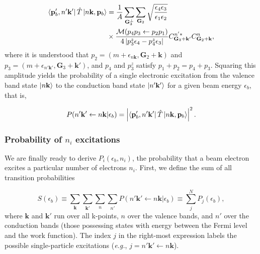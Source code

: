 \documentclass[twoside,twocolumn,9pt]{article}
\begin{document}
\begin{equation} 
  \begin{aligned}
      \bra{\mathbf{p}_b', n'\mathbf{k'}} \hat{T} \ket{n\mathbf{k},\mathbf{p}_b}
      &=
      \frac{1}{A}
      \sum_{\mathbf{G}_3^\perp} \sum_{\mathbf{G}_2}
      \sqrt{\frac{ \epsilon_4\epsilon_3 }{ \epsilon_1\epsilon_2 }}
      \\&\times
      \frac{\mathcal{M}(p_4p_3\leftarrow p_2p_1)}
      {4\left|p_3^z\epsilon_4 - p_4^z\epsilon_3\right|}
      C_{\mathbf{G}_3+\mathbf{k'}}^{n'\ast} C_{\mathbf{G}_2+\mathbf{k}}^{n},
  \end{aligned}
  \label{eq:ampCode} 
\end{equation}
%
where it is understood that $p_2 = (m + \epsilon_{n\mathbf{k}},
\mathbf{G}_2 + \mathbf{k})$ and
$p_3 = (m + \epsilon_{n'\mathbf{k'}}, \mathbf{G}_3 + \mathbf{k'})$,
and $p_4$ and $p_3^z$ satisfy $p_1 + p_2 = p_4 + p_3$.
Squaring this amplitude yields the probability of a single electronic
excitation from the valence band state $\ket{n\mathbf{k}}$ to the conduction
band state $\ket{n'\mathbf{k'}}$ for a given beam energy $\epsilon_b$, that is,

\begin{equation}
  P(n'\mathbf{k'}\leftarrow n\mathbf{k}|\epsilon_b)
  =
  \left|
  \bra{\mathbf{p}_b', n'\mathbf{k'}} \hat{T} \ket{n\mathbf{k},\mathbf{p}_b}
  \right|^2.
  \label{eq:prob}
\end{equation}

\subsubsection{Probability of \texorpdfstring{$n_i$}{ni} excitations}
\label{sec:Pi}

We are finally ready to derive $P_i(\epsilon_b, n_i)$, the probability that a
beam electron excites a particular number of electrons $n_i$.  First, we define
the sum of all transition probabilities

\begin{equation}
  S(\epsilon_b)
  \equiv
  \sum_\mathbf{k} \sum_\mathbf{k'} \sum_n \sum_{n'}
  P(n'\mathbf{k}'\leftarrow n\mathbf{k}|\epsilon_b)
  \equiv
  \sum_j^N P_j(\epsilon_b),
  \label{eq:S}
\end{equation}
%
where $\mathbf{k}$ and $\mathbf{k'}$ run over all k-points, $n$ over
the valence bands, and $n'$ over the conduction bands (those possessing states
with energy between the Fermi level and the work function).
The index $j$ in the right-most expression labels the possible single-particle
excitations (\textit{e.g.}, $j=n'\mathbf{k'}\leftarrow n\mathbf{k}$).
\end{document}
